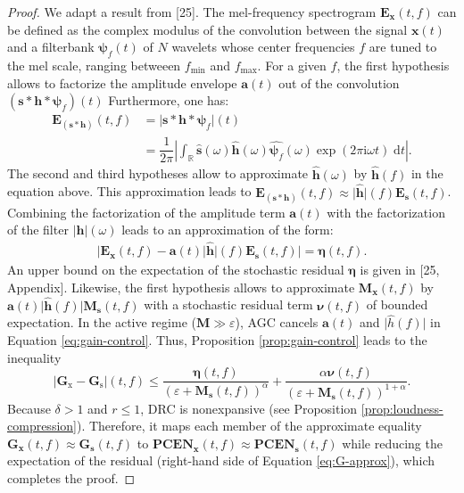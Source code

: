\documentclass[journal]{IEEEtran}
\theoremstyle{remark}
\begin{document}
\begin{proof}
We adapt a result from [25].
The mel-frequency spectrogram $\mathbf{E}_{\mathbf{x}}(t,f)$ can be defined as the complex modulus of the convolution between the signal $\mathbf{x}(t)$ and a filterbank $\mathbf{\psi}_{f} (t)$ of $N$ wavelets whose center frequencies $f$ are tuned to the mel scale, ranging betweeen $f_{\min}$ and $f_{\max}$.
For a given $f$, the first hypothesis allows to factorize the amplitude envelope $\mathbf{a}(t)$ out of the convolution $(\mathbf{s}\ast\mathbf{h}\ast\boldsymbol{\psi}_f)(t)$
Furthermore, one has:
\begin{align}
\mathbf{E}_{(\mathbf{s}\ast\mathbf{h})} (t,f) & =
\vert \mathbf{s} \ast \mathbf{h} \ast \boldsymbol{\psi}_f \vert (t)
\nonumber \\
& = \dfrac{1}{2\pi} \left \vert \int_{\mathbb{R}} \widehat{\mathbf{s}}(\omega) \widehat{\mathbf{h}}(\omega) \widehat{\boldsymbol{\psi}_f}(\omega) \exp(2 \pi \mathrm{i} \omega t) \;\mathrm{d}t \right \vert.
\end{align}
The second and third hypotheses allow to approximate $\widehat{\mathbf{h}}(\omega)$ by $\widehat{\mathbf{h}}(f)$ in the equation above.
This approximation leads to $\mathbf{E}_{(\mathbf{s}\ast\mathbf{h})} (t,f) \approx \vert\widehat{\mathbf{h}}\vert (f) \mathbf{E}_{\mathbf{s}} (t,f)$.
Combining the factorization of the amplitude term $\mathbf{a}(t)$ with the factorization of the filter $\vert\mathbf{h}\vert(\omega)$ leads to an approximation of the form:
\begin{align}
\big\vert \mathbf{E}_\mathbf{x}(t,f) - \mathbf{a}(t) \vert\widehat{\mathbf{h}}\vert(f) \mathbf{E}_\mathbf{s}(t,f) \big\vert = \boldsymbol{\eta}(t,f).
\end{align}
An upper bound on the expectation of the stochastic residual $\boldsymbol{\eta}$ is given in [25, Appendix].
Likewise, the first hypothesis allows to approximate $\mathbf{M}_\mathbf{x}(t,f)$ by $\mathbf{a}(t) \vert \widehat{\mathbf{h}}(f) \vert \mathbf{M}_{\mathbf{s}}(t,f)$ with a stochastic residual term $\mathbf{\nu}(t,f)$ of bounded expectation.
In the active regime ($\mathbf{M}\gg\varepsilon$), AGC cancels $\mathbf{a}(t)$ and $\vert\widehat{h}(f)\vert$ in Equation \ref{eq:gain-control}.
Thus, Proposition \ref{prop:gain-control} leads to the inequality
\begin{equation}
\vert \mathbf{G}_\mathrm{x} - \mathbf{G}_{\mathrm{s}} \vert (t,f)\leq
\dfrac{\boldsymbol{\eta}(t,f)}{(\varepsilon + \mathbf{M}_{\mathbf{s}}(t,f))^\alpha} + \dfrac{\alpha \boldsymbol{\nu}(t,f)}{(\varepsilon+\mathbf{M}_\mathbf{s} (t,f))^{1+\alpha}}.
\label{eq:G-approx}
\end{equation}
Because $\delta > 1$ and $r \leq 1$, DRC is nonexpansive (see Proposition \ref{prop:loudness-compression}).
Therefore, it maps each member of the approximate equality $\mathbf{G}_\mathbf{x} (t,f) \approx \mathbf{G}_\mathbf{s}(t,f)$ to $\mathbf{PCEN}_\mathbf{x} (t,f) \approx \mathbf{PCEN}_\mathbf{s}(t,f)$ while reducing the expectation of the residual (right-hand side of Equation \ref{eq:G-approx}), which completes the proof.
\end{proof}
\end{document}
